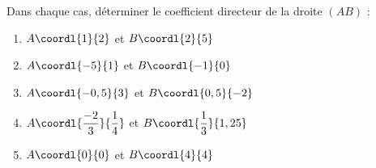 \begin{exo}{}
	Dans chaque cas, déterminer le coefficient directeur de la droite $(AB)$ :

	\begin{enumerate}
		\item $A\coordl{1}{2}$ et $B\coordl{2}{5}$
		\item $A\coordl{-5}{1}$ et $B\coordl{-1}{0}$
		\item $A\coordl{-0,5}{3}$ et $B\coordl{0,5}{-2}$
		\item $A\coordl{\dfrac{-2}{3}}{\dfrac{1}{4}}$ et $B\coordl{\dfrac{1}{3}}{1,25}$
		\item $A\coordl{0}{0}$ et $B\coordl{4}{4}$
	\end{enumerate}
\end{exo}
